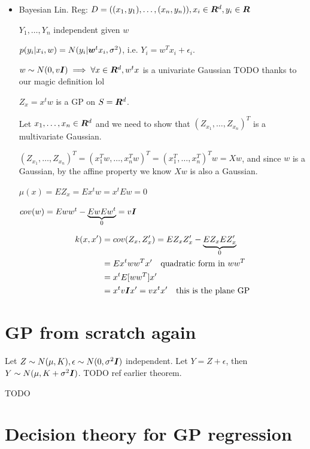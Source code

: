 \begin{itemize}
    \item Bayesian Lin. Reg: $D = ((x_1, y_1), \dots, (x_n, y_n)), x_i \in {\bm{R}}^d, y_i \in {\bm{R}}$
    
    $Y_1, \dots, Y_n$ independent given $w$
    
    $p(y_i | x_i, w) = N(y_i | {\bm{w}}^t x_i, \sigma^2)$, i.e. $Y_i = w^T x_i + \epsilon_i$.
    
    $w \sim N(0, v{\bm{I}}) \implies \forall x \in {\bm{R}}^d, w^t x$ is a univariate Gaussian {TODO thanks to our magic definition lol}
    
    $Z_x = x^t w$ is a GP on $S = {\bm{R}}^d$.
    
    Let $x_1, \dots, x_n \in {\bm{R}}^d$ and we need to show that $(Z_{x_1}, \dots, Z_{x_n})^T$ is a multivariate Gaussian.
    
    $(Z_{x_1}, \dots, Z_{x_n})^T = (x^T_1 w, \dots, x^T_n w)^T = (x^T_1, \dots, x^T_n)^T w = X w$, and since $w$ is a Gaussian, by the affine property we know $X w$ is also a Gaussian.
    
    $\mu(x) = E Z_x = E x^t w = x^t E w = 0$
    
    $cov(w) = E w w^t - \underbrace{E w E w^t}_0 = v {\bm{I}}$
    
    \begin{align}
        k(x, x') &= cov(Z_x, Z_x') = E Z_x Z_x' - \underbrace{E Z_x E Z_x'}_0 \\
        &= E x^t w w^T x' \quad \text{quadratic form in } w w^T \\
        &= x^t E[w w^T] x' \\
        &= x^t v {\bm{I}} x' = v x^t x' \quad \text{this is the plane GP}
    \end{align}
\end{itemize}

\section{GP from scratch again}

Let $Z \sim N(\mu, K), \epsilon \sim N(0, \sigma^2 {\bm{I}})$ independent. Let $Y = Z + \epsilon$, then $Y \sim N(\mu, K + \sigma^2 {\bm{I}})$. {TODO ref earlier theorem}.

TODO

\section{Decision theory for GP regression}

